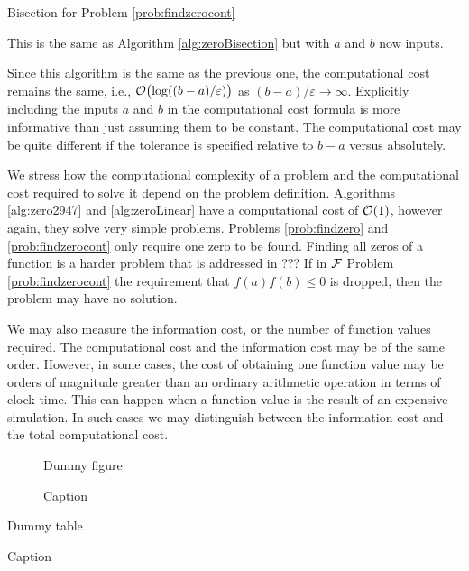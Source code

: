 \begin{algorithm}
\caption{Bisection for Problem \ref{prob:findzerocont}  \label{alg:zeroBisectionAB}}
This is the same as Algorithm \ref{alg:zeroBisection} but with $a$ and $b$ now inputs.
\end{algorithm}

Since this algorithm is the same as the previous one, the computational cost remains the same, i.e., $\operatorname{{\mathcal O}}\bigl(\log((b-a)/\varepsilon)\bigr)$ as $(b-a)/\varepsilon \to \infty$.  Explicitly including the inputs $a$ and $b$ in the computational cost formula is more informative than just assuming them to be constant.  The computational cost may be quite different if the tolerance is specified relative to $b-a$ versus absolutely.

We stress how the computational complexity of a problem and the computational cost required to solve it depend on the problem definition.  Algorithms \ref{alg:zero2947} and  \ref{alg:zeroLinear} have a computational cost of $\operatorname{{\mathcal O}}(1)$, however again, they solve very simple problems.  Problems \ref{prob:findzero} and \ref{prob:findzerocont} only require one zero to be found.  Finding all zeros of a function is a harder problem that is addressed in ???  If in  $\mathcal{F}$ Problem \ref{prob:findzerocont} the requirement that $f(a) f(b) \le 0$ is dropped, then the problem may have no solution. 

We may also measure the information cost, or the number of function values required.  The computational cost and the information cost may be of the same order.  However, in some cases, the cost of obtaining one function value may be orders of magnitude greater than an ordinary arithmetic operation in terms of clock time.  This can happen when a function value is the result of an expensive simulation.  In such cases we may distinguish between the information cost and the total computational cost.



\begin{figure}
    \centering
    Dummy figure
    \caption{Caption}
    \label{fig:my_label}
\end{figure}

\begin{table}[]
    \centering
   Dummy table
    \caption{Caption}
    \label{tab:my_label}
\end{table}